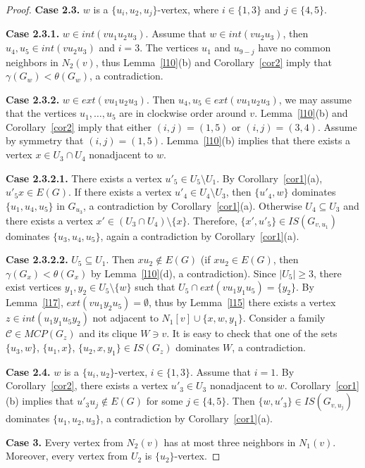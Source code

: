 \documentclass[12pt]{article}
\begin{document}
\begin{proof}
\textbf{Case 2.3.} $w$ is a $\{u_i,u_2,u_j\}$-vertex, where $i \in \{1,3\}$ and $j \in \{4,5\}$. 

\textbf{Case 2.3.1.} $w \in int(vu_1u_2u_3)$. Assume that $w \in int(vu_2u_3)$, then $u_4,u_5 \in int(vu_2u_3)$ and $i = 3$. The vertices $u_{1}$ and $u_{9-j}$ have no common neighbors in $N_2(v)$, thus Lemma~\ref{l10}(b) and Corollary~\ref{cor2}  imply that $\gamma(G_w) < \theta(G_w)$, a contradiction.

\textbf{Case 2.3.2.} $w \in ext(vu_1u_2u_3)$. Then $u_4,u_5 \in ext(vu_1u_2u_3)$, we may assume that the vertices $u_1,\ldots,u_5$ are in clockwise order around $v$. Lemma~\ref{l10}(b) and Corollary~\ref{cor2} imply that either $(i,j) = (1,5)$ or $(i,j) = (3,4)$. Assume by symmetry that $(i,j) = (1,5)$. Lemma~\ref{l10}(b) implies that there exists a vertex $x \in U_3 \cap U_4$ nonadjacent to $w$.

\textbf{Case 2.3.2.1.} There exists a vertex $u'_5 \in U_5 \setminus U_1$. By Corollary~\ref{cor1}(a), $u'_5x \in E(G)$. If there exists a vertex $u'_4 \in U_4 \setminus U_3$, then $\{u'_4,w\}$ dominates $\{u_1,u_4,u_5\}$ in $G_{u_3}$, a contradiction by Corollary~\ref{cor1}(a). Otherwise $U_4 \subseteq U_3$ and there exists a vertex $x' \in (U_3 \cap U_4) \setminus \{x\}$. Therefore, $\{x',u'_5\} \in IS(G_{v,u_1})$ dominates $\{u_3,u_4,u_5\}$, again a contradiction by Corollary~\ref{cor1}(a).

\textbf{Case 2.3.2.2.} $U_5 \subseteq U_1$. Then $xu_2 \notin E(G)$ (if $xu_2 \in E(G)$, then $\gamma(G_{x}) < \theta(G_{x})$ by Lemma~\ref{l10}(d), a contradiction). Since $|U_5| \geq 3$, there exist vertices $y_1,y_2 \in U_5 \setminus \{w\}$ such that $U_5 \cap ext(vu_1y_1u_5) = \{y_2\}$. By Lemma~\ref{l17}, $ext(vu_1y_2u_5) = \emptyset$, thus by Lemma~\ref{l15} there exists a vertex $z \in int(u_1y_1u_5y_2)$ not adjacent to $N_1[v] \cup \{x,w,y_1\}$. Consider a family $\mathcal{C} \in MCP(G_z)$ and its clique $W \ni v$. It is easy to check that one of the sets $\{u_3,w\}$, $\{u_1,x\}$, $\{u_2,x,y_1\} \in IS(G_z)$ dominates $W$, a contradiction.

\textbf{Case 2.4.} $w$ is a $\{u_i,u_2\}$-vertex, $i \in \{1,3\}$. Assume that $i = 1$. By Corollary~\ref{cor2}, there exists a vertex $u'_3 \in U_3$ nonadjacent to $w$. Corollary~\ref{cor1}(b) implies that $u'_3u_j \notin E(G)$ for some $j \in \{4,5\}$. Then $\{w,u'_3\} \in IS(G_{v,u_j})$ dominates $\{u_1,u_2,u_3\}$, a contradiction by Corollary~\ref{cor1}(a).

\textbf{Case 3.} Every vertex from $N_2(v)$ has at most three neighbors in $N_1(v)$. Moreover, every vertex from $U_2$ is $\{u_2\}$-vertex.


\end{proof}
\end{document}
